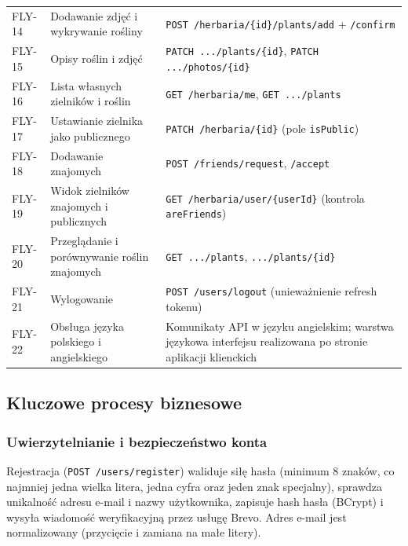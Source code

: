 \documentclass[12pt,a4paper]{article}
\begin{document}
\begin{small}
\begin{longtable}{@{}p{1.4cm}p{4.6cm}p{8.0cm}@{}}
FLY-14 & Dodawanie zdj\k{e}\'c i wykrywanie ro\'sliny & \texttt{POST /herbaria/\allowbreak{}\{id\}/\allowbreak{}plants/\allowbreak{}add} + \texttt{/confirm} \\ \addlinespace
FLY-15 & Opisy ro\'slin i zdj\k{e}\'c & \texttt{PATCH .../plants/\{id\}}, \texttt{PATCH .../photos/\{id\}} \\ \addlinespace
FLY-16 & Lista w\l{}asnych zielnik\'ow i ro\'slin & \texttt{GET /herbaria/me}, \texttt{GET .../plants} \\ \addlinespace
FLY-17 & Ustawianie zielnika jako publicznego & \texttt{PATCH /herbaria/\{id\}} (pole \texttt{isPublic}) \\ \addlinespace
FLY-18 & Dodawanie znajomych & \texttt{POST /friends/request}, \texttt{/accept} \\ \addlinespace
FLY-19 & Widok zielnik\'ow znajomych i publicznych & \texttt{GET /herbaria/user/\{userId\}} (kontrola \texttt{areFriends}) \\ \addlinespace
FLY-20 & Przegl\k{a}danie i por\'ownywanie ro\'slin znajomych & \texttt{GET .../plants}, \texttt{.../plants/\{id\}} \\ \addlinespace
FLY-21 & Wylogowanie & \texttt{POST /users/logout} (uniewa\.znienie refresh tokenu) \\ \addlinespace
FLY-22 & Obs\l{}uga j\k{e}zyka polskiego i angielskiego & Komunikaty API w j\k{e}zyku angielskim; warstwa j\k{e}zykowa interfejsu realizowana po stronie aplikacji klienckich \\
\end{longtable}
\end{small}

\subsection{Kluczowe procesy biznesowe}

\subsubsection{Uwierzytelnianie i bezpiecze\'nstwo konta}

Rejestracja (\texttt{POST /users/register}) waliduje si\l{}\k{e} has\l{}a (minimum 8 znak\'ow, co najmniej jedna wielka litera, jedna cyfra oraz jeden znak specjalny), sprawdza unikalno\'s\'c adresu e-mail i nazwy u\.zytkownika, zapisuje hash has\l{}a (BCrypt) i wysy\l{}a wiadomo\'s\'c weryfikacyjn\k{a} przez us\l{}ug\k{e} Brevo. Adres e-mail jest normalizowany (przyci\k{e}cie i zamiana na ma\l{}e litery).
\end{document}
